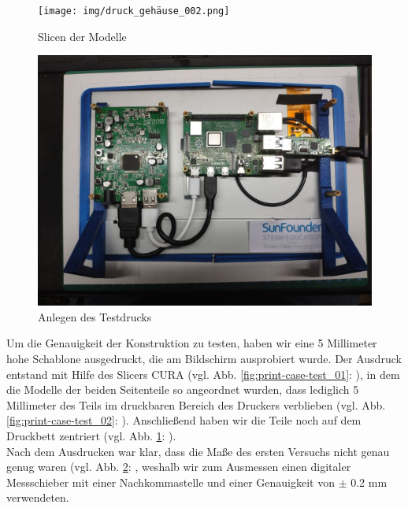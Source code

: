 \begin{figure}[H]
	\texttt{[image: img/druck\_gehäuse\_002.png]}
	\caption[Slicen der Modelle]{Slicen der Modelle}
	\label{fig:print-case-test_03}
\end{figure}
\begin{figure}[H]
	\includegraphics[width=1\textwidth]{img/testdruck_an_bildschirm.jpg}
	\caption[Anlegen des Testdrucks]{Anlegen des Testdrucks}
	\label{fig:print-case-test_04}
\end{figure}
\noindent Um die Genauigkeit der Konstruktion zu testen, haben wir eine 5 Millimeter hohe Schablone ausgedruckt, die am Bildschirm ausprobiert wurde. 
Der Ausdruck entstand mit Hilfe des Slicers CURA (vgl. Abb. \ref{fig:print-case-test_01}: ), in dem die Modelle der beiden Seitenteile so angeordnet wurden, dass lediglich 5 Millimeter des Teils im druckbaren Bereich des Druckers verblieben (vgl. Abb. \ref{fig:print-case-test_02}: ). 
Anschließend haben wir die Teile noch auf dem Druckbett zentriert (vgl. Abb. \ref{fig:print-case-test_03}: ).\\
\noindent Nach dem Ausdrucken war klar, dass die Maße des ersten Versuchs nicht genau genug waren (vgl. Abb. \ref{fig:print-case-test_04}: , weshalb wir zum Ausmessen einen digitaler Messschieber mit einer Nachkommastelle und einer  Genauigkeit von $\pm$ 0.2 mm verwendeten.